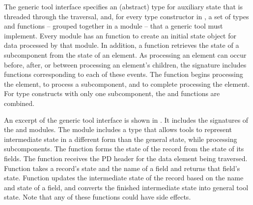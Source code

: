The generic tool interface specifies an (abstract) type for auxiliary
state that is threaded through the traversal, and, for every type
constructor in \padsml{}, a set of types and functions -- grouped
together in a module -- that a generic tool must implement. Every
module has an  function to create an initial state object for
data processed by that module. In addition, a  function
retrieves the state of a subcomponent from the state of an element. As
processing an element can occur before, after, or between processing
an element's children, the signature includes functions corresponding
to each of these events. The function  begins processing the
element,  to process a subcomponent, and 
to complete processing the element. For type constructs with only one
subcomponent, the  and  functions are combined.


An excerpt of the generic tool interface is shown in
. It includes the signatures of the
 and  modules. The  module includes
a type  that allows tools to represent intermediate
state in a different form than the general state, while processing
subcomponents. The  function forms the state of the record
from the state of its fields. The  function receives the PD
header for the data element being traversed. Function 
takes a record's state and the name of a field and returns that
field's state. Function  updates the intermediate
state of the record based on the name and state of a field, and
 converts the finished intermediate state into general tool
state.  Note that any of these functions could have side effects.

